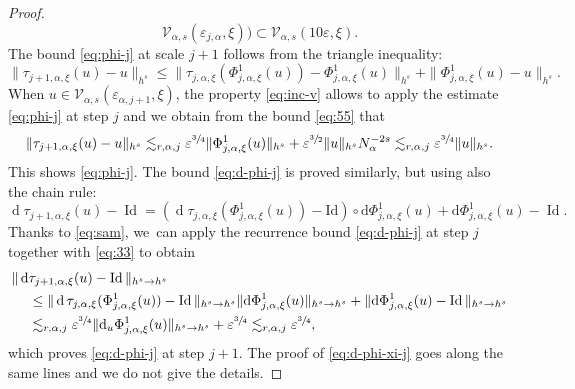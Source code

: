 \documentclass[10pt,a4paper]{amsart}
\theoremstyle{plain}
\theoremstyle{definition}
\newcommand{\1}{\mathbf{1}}
\let\epsilon\varepsilon
\begin{document}
\begin{proof}
\begin{equation}
\mathcal{V}_{\alpha,s}(\epsilon_{j,\alpha}, \xi)
)
\subset \mathcal{V}_{\alpha,s}(10\epsilon,\xi).
\end{equation}
The bound \eqref{eq:phi-j} at scale $j+1$ follows from the triangle inequality:\[
\|\tau_{j+1,\alpha,\xi}(u)
-u\|_{h^{s}}
\leq
\|\tau_{j,\alpha,\xi}(\Phi_{j,\alpha,\xi}^{1}(u)) - \Phi_{j,\alpha,\xi}^{1}(u)\|_{h^{s}}
+
\|\Phi_{j,\alpha,\xi}^{1}(u)
- u\|_{h^{s}}.
\]
When $u\in\mathcal{V}_{\alpha,s}(\epsilon_{\alpha,j+1},\xi)$,
the property \eqref{eq:inc-v} allows to apply the estimate \eqref{eq:phi-j} at step $j$ and we obtain from the bound \eqref{eq:55} that
\[
\|\tau_{j+1,\alpha,\xi}(u)
-u\|_{h^{s}}
\lesssim_{r,\alpha,j}\epsilon^{\sfrac{3}{4}}\|\Phi_{j,\alpha,\xi}^{1}(u)\|_{h^{s}}
+
\epsilon^{\sfrac{3}{2}}\|u\|_{h^{s}}N_{\alpha}^{-2s}
\lesssim_{r,\alpha,j}
\epsilon^{\sfrac{3}{4}}\|u\|_{h^{s}}.
\]
This shows \eqref{eq:phi-j}. The bound \eqref{eq:d-phi-j} is proved similarly, but using also the chain rule:
\[
\operatorname{d}\tau_{j+1,\alpha,\xi}(u) - \operatorname{Id}
= (\operatorname{d}\tau_{j,\alpha,\xi}(\Phi_{j,\alpha,\xi}^{1}(u))-\mathrm{Id})
\circ
\mathrm{d}\Phi_{j,\alpha,\xi}^{1}(u)
+
\mathrm{d}
\Phi_{j,\alpha,\xi}^{1}(u)
- \operatorname{Id}.
\]
Thanks to \eqref{eq:sam}, we~can apply the recurrence bound \eqref{eq:d-phi-j} at step $j$ together with \eqref{eq:33} to obtain
\begin{align*}
\|
\operatorname{d}&\tau_{j+1,\alpha,\xi}(u) - \operatorname{Id}
\|_{h^{s}\to h^{s}} \\
&\leq
\|
\operatorname{d}\tau_{j,\alpha,\xi}(\Phi_{j,\alpha,\xi}^{1}(u)) - \operatorname{Id}
\|_{h^{s}\to h^{s}}
\|
\mathrm{d}\Phi_{j,\alpha,\xi}^{1}(u)
\|_{h^{s}\to h^{s}}
+
\|
\mathrm{d}\Phi_{j,\alpha,\xi}^{1}(u)
- \operatorname{Id}
\|_{h^{s}\to h^{s}} \\
&\lesssim_{r,\alpha,j}\epsilon^{\sfrac{3}{4}}\|
\mathrm{d}_{u}\Phi_{j,\alpha,\xi}^{1}(u)
\|_{h^{s}\to h^{s}} + \epsilon^{\sfrac{3}{4}}
\lesssim_{r,\alpha,j}
\epsilon^{\sfrac{3}{4}},
\end{align*}
which proves \eqref{eq:d-phi-j} at step $j+1$. The proof of \eqref{eq:d-phi-xi-j} goes along the same lines and we do not give the details.


\end{proof}
\end{document}
